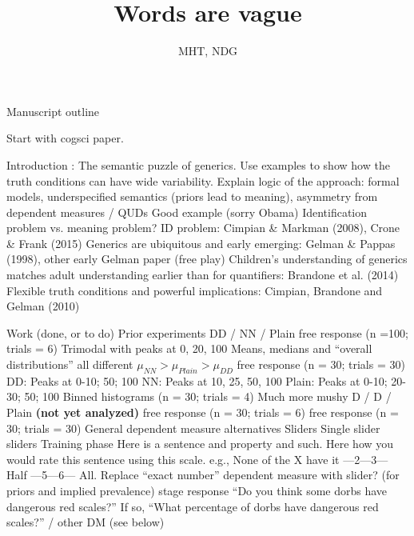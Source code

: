 \documentclass{article}
\begin{document}
\title{Words are vague}
\author{MHT, NDG} \maketitle
 
\begin{outline}
  \0 Manuscript outline
  
  Start with cogsci paper.
  
  		\1 Introduction : The semantic puzzle of generics. Use examples to show how the truth conditions can have wide variability. Explain logic of the approach: formal models, underspecified semantics (priors lead to meaning), asymmetry from dependent measures / QUDs
			\2 Good example (sorry Obama)
			\2 Identification problem vs. meaning problem? 
				\3 ID problem: Cimpian \& Markman (2008), Crone \& Frank (2015)
			\2 Generics are ubiquitous and early emerging: Gelman \& Pappas (1998), other early Gelman paper (free play)
			\2 Children's understanding of generics matches adult understanding earlier than for quantifiers: Brandone et al. (2014)
			\2 Flexible truth conditions and powerful implications: Cimpian, Brandone and Gelman (2010)
	
\vspace{2cm}
	\0 Work (done, or to do)
		\1 Prior experiments
			\2 DD / NN / Plain
				 free response (n =100; trials = 6)
					\4 Trimodal with peaks at 0, 20, 100
					\4 Means, medians and ``overall distributions'' all different
					\4$ \mu_{NN} > \mu_{Plain} > \mu_{DD} $
				 free response (n = 30; trials = 30)
					\4 DD: Peaks at 0-10; 50; 100
					\4 NN: Peaks at 10, 25, 50, 100
					\4 Plain: Peaks at 0-10; 20-30; 50; 100
				\3 Binned histograms (n = 30; trials = 4)
					\4 Much more mushy
			\2 D / D / Plain \textbf{(not yet analyzed)}
				 free response (n = 30; trials = 6)
				 free response (n = 30; trials = 30)
			\2 General dependent measure alternatives
				\3 Sliders
					\4 Single slider
					\4 5 sliders
				\3 Training phase
					\4 Here is a sentence and property and such.
					\4 Here how you would rate this sentence using this scale.
					\4 e.g., None of the X have it ---2---3--- Half ---5---6--- All.
				\3 Replace ``exact number'' dependent measure with slider? (for priors and implied prevalence)
				 stage response
					\4 ``Do you think some dorbs have dangerous red scales?''
					\4 If so, ``What percentage of dorbs have dangerous red scales?'' / other DM (see below)
					

\end{outline}
\end{document}

